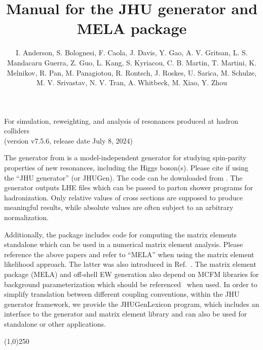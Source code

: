 \documentclass[aps,superscriptaddress,nofootinbib]{revtex4}
\begin{document}
\vspace{0.6cm}

\title{
\large
Manual for the JHU generator and MELA package
}
\author{I. Anderson, S. Bolognesi, F. Caola, J. Davis, Y. Gao, A. V. Gritsan, L. S. Mandacaru Guerra, Z. Guo, L. Kang, S. Kyriacou, C. B. Martin, T. Martini, K. Melnikov, 
R. Pan, M. Panagiotou, R. Rontsch, J. Roskes, U. Sarica, M. Schulze, M. V. Srivastav, N. V. Tran, A. Whitbeck, M. Xiao, Y. Zhou}
\maketitle
\begin{center}
\small
For simulation, reweighting, and analysis of resonances produced at hadron colliders \\
(version v7.5.6, release date July 8, 2024) \\
\normalsize
\end{center}


\noindent
The generator from \cite{Gao:2010qx,Bolognesi:2012,Anderson:2013,Gritsan:2016hjl,Gritsan:2020pib,Martini:2021uey,Davis:2022} 
is a model-independent generator for studying spin-parity properties of new resonances, including the Higgs boson(s). 
Please cite \cite{Gao:2010qx,Bolognesi:2012,Anderson:2013,Gritsan:2016hjl,Gritsan:2020pib,Martini:2021uey,Davis:2022} 
if using the ``JHU generator'' (or JHUGen). The code can be downloaded from \cite{thesite}.
The generator outputs LHE files which can be passed to parton shower programs for hadronization.
Only relative values of cross sections are supposed to produce meaningful results, 
while absolute values are often subject to an arbitrary normalization.

Additionally, the package includes code for computing the matrix elements standalone which can be used in a numerical matrix element analysis.
Please reference the above papers and refer to ``MELA'' when using the matrix element likelihood approach.
The latter was also introduced in Ref.~\cite{Chatrchyan:2012ufa}. The matrix element package (MELA) and off-shell EW generation 
also depend on MCFM libraries for background parameterization which should be referenced~\cite{Campbell:2010ff} when used.
In order to simplify translation between different coupling conventions, within the JHU generator framework, we provide the JHUGenLexicon program,
which includes an interface to the generator and matrix element library and can also be used for standalone or other applications. 


\vspace{0.5cm}
\begin{center}
\line(1,0){250}
\end{center}
\vspace{0.5cm}
\tableofcontents
\begin{center}
\end{center}
\vspace{0.5cm}
\end{document}
